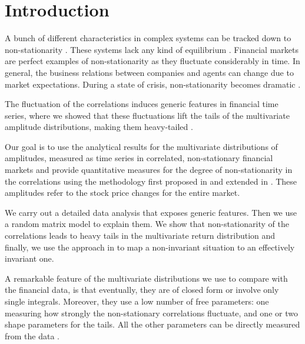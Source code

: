 \section{Introduction}\label{sec:introduction}

A bunch of different characteristics in complex systems can be tracked down to
non-stationarity \cite{non_stat_1,non_stat_2}. These systems lack any kind of
equilibrium \cite{comp_sys_1,comp_sys_2,comp_sys_3,comp_sys_4}. Financial
markets are perfect examples of non-stationarity as they fluctuate considerably
in time. In general, the business relations between companies and agents can
change due to market expectations. During a state of crisis, non-stationarity
becomes dramatic
\cite{state_crisis_1,state_crisis_2,state_crisis_3,state_crisis_4,state_crisis_5,state_crisis_6,state_crisis_7}.

The fluctuation of the correlations induces generic features in financial time
series, where we showed that these fluctuations lift the tails of the
multivariate amplitude distributions, making them heavy-tailed
\cite{non_stationarity_fin_guhr,exact_distributions_guhr}.

Our goal is to use the analytical results for the multivariate distributions of
amplitudes, measured as time series in correlated, non-stationary financial
markets and provide quantitative measures for the degree of non-stationarity in
the correlations using the methodology first proposed in
\cite{non_stationarity_fin_guhr} and extended in
\cite{exact_distributions_guhr}. These amplitudes refer to the stock price
changes for the entire market.

We carry out a detailed data analysis that exposes generic features. Then we
use a random matrix model to explain them. We show that non-stationarity of the
correlations leads to heavy tails in the multivariate return distribution and
finally, we use the approach in
\cite{non_stationarity_fin_guhr,exact_distributions_guhr} to map a
non-invariant situation to an effectively invariant one.

A remarkable feature of the multivariate distributions we use to compare with
the financial data, is that eventually, they are of closed form or involve only
single integrals. Moreover, they use a low number of free parameters: one
measuring how strongly the non-stationary correlations fluctuate, and one or
two shape parameters for the tails. All the other parameters can be directly
measured from the data \cite{exact_distributions_guhr}.

